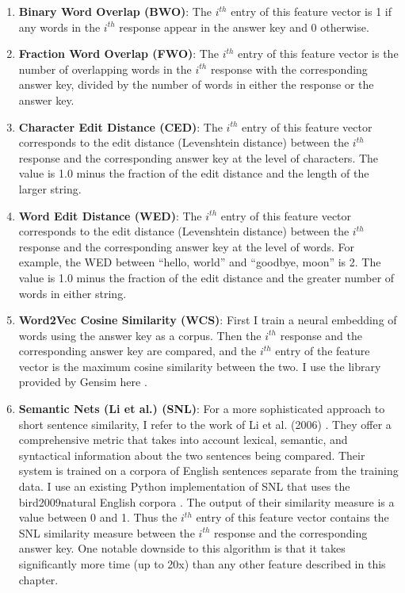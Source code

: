 \begin{enumerate}
\item \textbf{Binary Word Overlap (BWO)}: The $i^{th}$ entry of this feature vector is 1 if any words in the $i^{th}$ response appear in the answer key and 0 otherwise.
\item \textbf{Fraction Word Overlap (FWO)}: The $i^{th}$ entry of this feature vector is the number of overlapping words in the $i^{th}$ response with the corresponding answer key, divided by the number of words in either the response or the answer key.  
\item \textbf{Character Edit Distance (CED)}: The $i^{th}$ entry of this feature vector corresponds to the edit distance (Levenshtein distance) between the $i^{th}$ response and the corresponding answer key at the level of characters. The value is 1.0 minus the fraction of the edit distance and the length of the larger string.
\item \textbf{Word Edit Distance (WED)}:  The $i^{th}$ entry of this feature vector corresponds to the edit distance (Levenshtein distance) between the $i^{th}$ response and the corresponding answer key at the level of words. For example, the WED between ``hello, world'' and ``goodbye, moon'' is 2. The value is 1.0 minus the fraction of the edit distance and the greater number of words in either string.
\item \textbf{Word2Vec Cosine Similarity (WCS)}: First I train a neural embedding of words using the answer key as a corpus. Then the $i^{th}$ response and the corresponding answer key are compared, and the $i^{th}$ entry of the feature vector is the maximum cosine similarity between the two. I use the library provided by Gensim here \cite{sojka2010software}.
\item \textbf{Semantic Nets (Li et al.) (SNL)}: For a more sophisticated approach to short sentence similarity, I refer to the work of Li et al. (2006) \cite{li2006sentence}. They offer a comprehensive metric that takes into account lexical, semantic, and syntactical information about the two sentences being compared. Their system is trained on a corpora of English sentences separate from the training data. I use an existing Python implementation of SNL that uses the bird2009natural English corpora \cite{bird2009natural}. The output of their similarity measure is a value between 0 and 1. Thus the $i^{th}$ entry of this feature vector contains the SNL similarity measure between the $i^{th}$ response and the corresponding answer key. One notable downside to this algorithm is that it takes significantly more time (up to 20x) than any other feature described in this chapter.
\end{enumerate}

